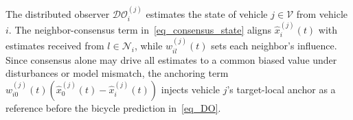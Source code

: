 \documentclass[journal,twoside]{IEEEtran}
\def\col#1{\mathop{{\rm col}\,\left(\,#1\,\right)}}
\def\N{\mathcal{N}} %
\def\DO{\mathcal{DO}} %
\begin{document}
The distributed observer $\DO_i^{(j)}$ estimates the state of vehicle $j \in \mathcal{V}$ from vehicle $i$.
The neighbor-consensus term in~\eqref{eq_consensus_state} aligns $\hat{x}_i^{(j)}(t)$ with estimates received from $l \in \N_i$, while $w_{il}^{(j)}(t)$ sets each neighbor's influence. Since consensus alone may drive all estimates to a common biased value under disturbances or model mismatch, the anchoring term $w_{i0}^{(j)}(t)(\hat{x}_0^{(j)}(t)-\hat{x}_i^{(j)}(t))$ injects vehicle $j$'s target-local anchor as a reference before the bicycle prediction in~\eqref{eq_DO}. 

\end{document}
